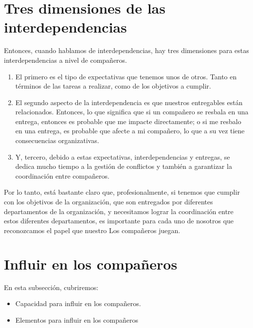 \documentclass[10pt]{book}
\begin{document}
\section{Tres dimensiones de las interdependencias}
Entonces, cuando hablamos de interdependencias, hay tres dimensiones para estas interdependencias a nivel de compañeros. 
\begin{enumerate}[\bfseries 1.]
\item El primero es el tipo de expectativas que tenemos unos de otros. Tanto en términos de las tareas a realizar, como de los objetivos a cumplir.
\item El segundo aspecto de la interdependencia es que nuestros entregables están relacionados. Entonces, lo que significa que si un compañero se resbala en una entrega, entonces es probable que me impacte directamente; o si me resbalo en una entrega, es probable que afecte a mi compañero, lo que a su vez tiene consecuencias organizativas.
\item Y, tercero, debido a estas expectativas, interdependencias y entregas, se dedica mucho tiempo a la gestión de conflictos y también a garantizar la coordinación entre compañeros.  
\end{enumerate}
Por lo tanto, está bastante claro que, profesionalmente, si tenemos que cumplir con los objetivos de la organización, que son entregados por diferentes departamentos de la organización, y necesitamos lograr la coordinación entre estos diferentes departamentos, es importante para cada uno de nosotros que reconozcamos el papel que nuestro Los compañeros juegan.
\section{Influir en los compañeros}
En esta subsección, cubriremos:
\begin{itemize}
\item Capacidad para influir en los compañeros.
\item Elementos para influir en los compañeros
\end{itemize}
\end{document}
